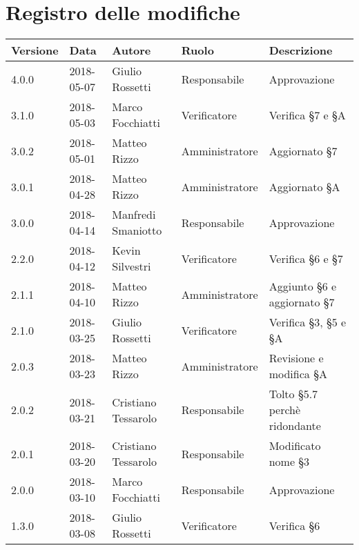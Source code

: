 \documentclass[./PianodiProgetto.tex]{subfiles}
\begin{document}
\chapter*{Registro delle modifiche}
\setlength\LTleft{-22mm}
\begin{longtable}{|p{20mm}|p{20mm}|p{40mm}|p{30mm}|p{50mm}|}
	\hline
	\textbf{Versione} & \textbf{Data} & \textbf{Autore} & \textbf{Ruolo} & \textbf{Descrizione} \\ 
	
		\hline 4.0.0 & 2018-05-07 & Giulio Rossetti & Responsabile & Approvazione \\
		
		\hline 3.1.0 & 2018-05-03 & Marco Focchiatti & Verificatore & Verifica §7 e §A \\
		
		\hline 3.0.2 & 2018-05-01 & Matteo Rizzo & Amministratore & Aggiornato §7 \\ 
		
		\hline 3.0.1 & 2018-04-28 & Matteo Rizzo & Amministratore & Aggiornato §A \\ 
		
		
	
		\hline 3.0.0 & 2018-04-14 & Manfredi Smaniotto & Responsabile & Approvazione \\
	
		\hline 2.2.0 & 2018-04-12 & Kevin Silvestri & Verificatore & Verifica §6 e §7 \\
	
		\hline 2.1.1 & 2018-04-10 & Matteo Rizzo & Amministratore & Aggiunto §6 e aggiornato §7 \\ 
		
		\hline 2.1.0 & 2018-03-25 & Giulio Rossetti & Verificatore & Verifica §3, §5 e §A  \\
	
		\hline 2.0.3 & 2018-03-23 & Matteo Rizzo & Amministratore & Revisione e modifica §A \\
		
		\hline 2.0.2 & 2018-03-21 & Cristiano Tessarolo & Responsabile & Tolto §5.7 perchè ridondante \\
	
		\hline 2.0.1 & 2018-03-20 & Cristiano Tessarolo & Responsabile & Modificato nome §3 \\
	
		\hline 2.0.0 & 2018-03-10 & Marco Focchiatti & Responsabile & Approvazione \\
		
		\hline 1.3.0 & 2018-03-08 & Giulio Rossetti & Verificatore & Verifica §6 \\
		

\end{longtable}
\end{document}

